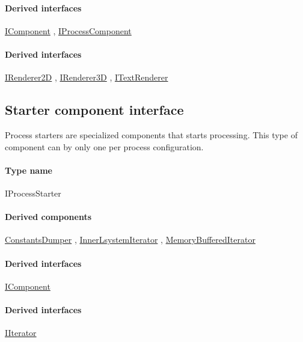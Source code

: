 	\paragraph{Derived interfaces}
		\hyperref[Malsys.Processing.Components.IComponent]{IComponent}%
, 		\hyperref[Malsys.Processing.Components.IProcessComponent]{IProcessComponent}%
	\paragraph{Derived interfaces}
		\hyperref[Malsys.Processing.Components.Renderers.IRenderer2D]{IRenderer2D}%
, 		\hyperref[Malsys.Processing.Components.Renderers.IRenderer3D]{IRenderer3D}%
, 		\hyperref[Malsys.Processing.Components.Renderers.ITextRenderer]{ITextRenderer}%
	

\subsection{Starter component interface}
\label{Malsys.Processing.Components.IProcessStarter}
Process starters are specialized components that starts processing.
            This type of component can by only one per process configuration.\paragraph{Type name}
IProcessStarter	\paragraph{Derived components}
		\hyperref[Malsys.Processing.Components.Common.ConstantsDumper]{ConstantsDumper}%
, 		\hyperref[Malsys.Processing.Components.RewriterIterators.InnerLsystemIterator]{InnerLsystemIterator}%
, 		\hyperref[Malsys.Processing.Components.RewriterIterators.MemoryBufferedIterator]{MemoryBufferedIterator}%
	\paragraph{Derived interfaces}
		\hyperref[Malsys.Processing.Components.IComponent]{IComponent}%
	\paragraph{Derived interfaces}
		\hyperref[Malsys.Processing.Components.IIterator]{IIterator}%
	

